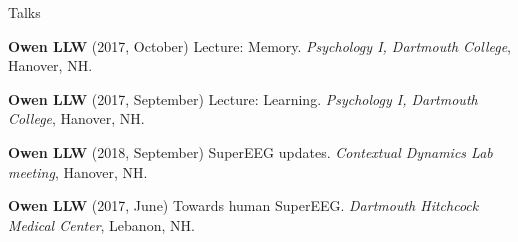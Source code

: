 \documentclass{resume} %
\begin{document}
\begin{rSection}{Talks}
\item \textbf{Owen LLW} (2017, October) Lecture: Memory. \textit{Psychology I, Dartmouth College}, Hanover, NH.

\item \textbf{Owen LLW} (2017, September) Lecture: Learning. \textit{Psychology I, Dartmouth College}, Hanover, NH.

\item \textbf{Owen LLW} (2018, September) SuperEEG updates.
\textit{Contextual Dynamics Lab meeting}, Hanover, NH.

\item \textbf{Owen LLW} (2017, June) Towards human SuperEEG. \textit{Dartmouth Hitchcock Medical Center}, Lebanon, NH.


\end{rSection}



\end{document}
